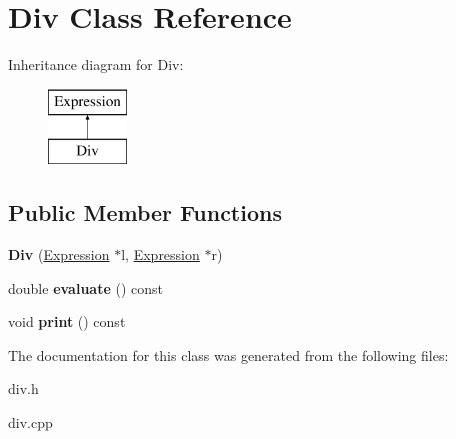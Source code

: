 \hypertarget{class_div}{}\section{Div Class Reference}
\label{class_div}
Inheritance diagram for Div\+:\begin{figure}[H]
\begin{center}
\leavevmode
\includegraphics[height=2.000000cm]{class_div}
\end{center}
\end{figure}
\subsection*{Public Member Functions}
\begin{DoxyCompactItemize}
\item 
\mbox{\label{class_div_a31f89c83d9d65cf54396ebbea8af809a}} 
{\bfseries Div} (\hyperlink{class_expression}{Expression} $\ast$l, \hyperlink{class_expression}{Expression} $\ast$r)
\item 
\mbox{\label{class_div_a5b96e19e7cffdb205a9e56377be3652e}} 
double {\bfseries evaluate} () const
\item 
\mbox{\label{class_div_acbcc6e3d0f3ccb5e74de28de8499cbbf}} 
void {\bfseries print} () const
\end{DoxyCompactItemize}


The documentation for this class was generated from the following files\+:\begin{DoxyCompactItemize}
\item 
div.\+h\item 
div.\+cpp\end{DoxyCompactItemize}
